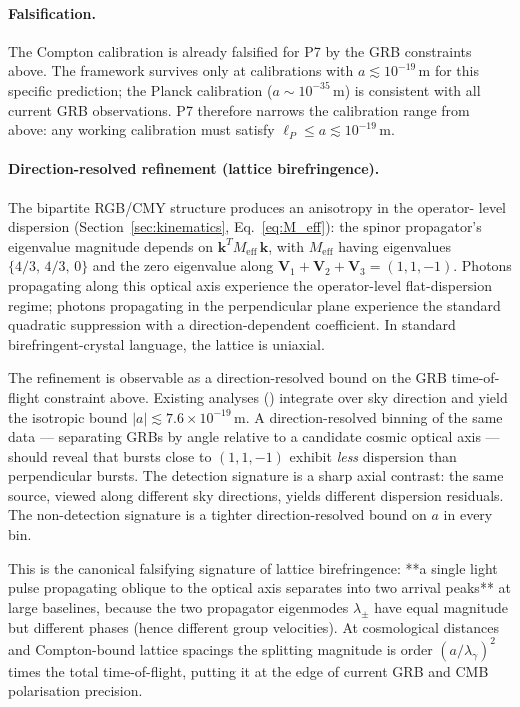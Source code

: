 \paragraph{Falsification.}
The Compton calibration is already falsified for P7 by the GRB
constraints above. The framework survives only at calibrations with
$a \lesssim 10^{-19}\,\text{m}$ for this specific prediction; the
Planck calibration ($a \sim 10^{-35}\,\text{m}$) is consistent with
all current GRB observations. P7 therefore narrows the calibration
range from above: any working calibration must satisfy
$\ell_P \le a \lesssim 10^{-19}\,\text{m}$.

\paragraph{Direction-resolved refinement (lattice birefringence).}
The bipartite RGB/CMY structure produces an anisotropy in the operator-
level dispersion (Section~\ref{sec:kinematics}, Eq.~\eqref{eq:M_eff}):
the spinor propagator's eigenvalue magnitude depends on $\mathbf{k}^T
M_\text{eff}\,\mathbf{k}$, with $M_\text{eff}$ having eigenvalues
$\{4/3,\,4/3,\,0\}$ and the zero eigenvalue along
$\mathbf{V}_1+\mathbf{V}_2+\mathbf{V}_3 = (1,1,-1)$.  Photons
propagating along this optical axis experience the operator-level
flat-dispersion regime; photons propagating in the perpendicular
plane experience the standard quadratic suppression with a
direction-dependent coefficient.  In standard birefringent-crystal
language, the lattice is uniaxial.

The refinement is observable as a direction-resolved bound on the
GRB time-of-flight constraint above.  Existing analyses
(\cite{vasileiou2013}) integrate over sky direction and yield the
isotropic bound $|a| \lesssim 7.6\times 10^{-19}\,\mathrm{m}$.  A
direction-resolved binning of the same data — separating GRBs by
angle relative to a candidate cosmic optical axis — should reveal
that bursts close to $(1,1,-1)$ exhibit \emph{less} dispersion than
perpendicular bursts.  The detection signature is a sharp axial
contrast: the same source, viewed along different sky directions,
yields different dispersion residuals.  The non-detection signature
is a tighter direction-resolved bound on $a$ in every bin.

This is the canonical falsifying signature of lattice birefringence:
**a single light pulse propagating oblique to the optical axis
separates into two arrival peaks** at large baselines, because the
two propagator eigenmodes $\lambda_\pm$ have equal magnitude but
different phases (hence different group velocities).  At
cosmological distances and Compton-bound lattice spacings the
splitting magnitude is order $(a/\lambda_\gamma)^2$ times the
total time-of-flight, putting it at the edge of current
GRB and CMB polarisation precision.

